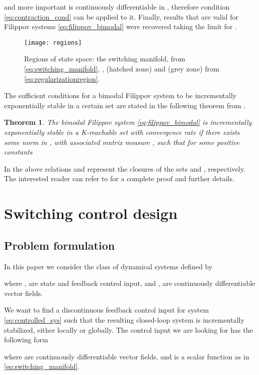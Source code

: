\documentclass[letterpaper, 10 pt, conference]{ieeeconf}
\newtheorem{theorem}{Theorem}
\begin{document}
and more important  is continuously differentiable in , therefore condition \eqref{eq:contraction_cond} can be applied to it. Finally, results that are valid for Filippov systems \eqref{eq:filippov_bimodal} were recovered taking the limit for .
\begin{figure}[t]
\centering 
{\texttt{[image: regions]}}
\caption{Regions of state space: the switching manifold,  from \eqref{eq:switching_manifold}, 
,  (hatched zone) and  (grey zone) from \eqref{eq:regularizationregion}.} 
\label{fig:regions}
\end{figure}

The sufficient conditions for a bimodal Filippov system to be incrementally exponentially stable in a certain set are stated in the following theorem from \cite{fiore2015contraction}. 

\begin{theorem}
\label{thm:contracting_pws}
The bimodal Filippov system \eqref{eq:filippov_bimodal} is incrementally exponentially stable in a K-reachable set  with convergence rate  if there exists some norm in , with associated matrix measure , such that for some positive constants 

\end{theorem}
\vspace{0.3cm}
In the above relations  and  represent the closures of the sets  and , respectively.
The interested reader can refer to \cite{fiore2015contraction} for a complete proof and further details.

\section{Switching control design}
\label{sec:control_design}
\subsection{Problem formulation}
In this paper we consider the class of dynamical systems defined by

where ,  are state and feedback control input, and  ,  are continuously differentiable vector fields.

We want to find a discontinuous feedback control input  for system \eqref{eq:controlled_sys} such that the resulting closed-loop system is incrementally stabilized, either locally or globally. The control input  we are looking for has the following form

where  are continuously differentiable vector fields, and  is a scalar function as in \eqref{eq:switching_manifold}.
\end{document}
